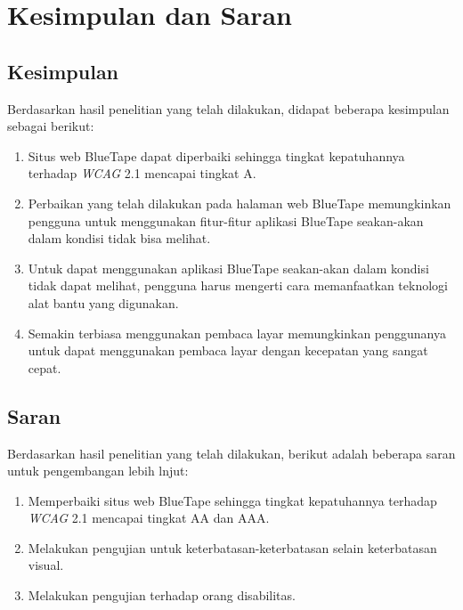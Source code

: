 \chapter{Kesimpulan dan Saran}
\label{chap:kesimpulan_dan_saran}

\section{Kesimpulan}
\label{sec:kesimpulan}
Berdasarkan hasil penelitian yang telah dilakukan, didapat beberapa kesimpulan sebagai berikut:

\begin{enumerate}
    \item Situs web BlueTape dapat diperbaiki sehingga tingkat kepatuhannya terhadap \textit{WCAG} 2.1 mencapai tingkat A.
    \item Perbaikan yang telah dilakukan pada halaman web BlueTape memungkinkan pengguna untuk menggunakan fitur-fitur aplikasi BlueTape seakan-akan dalam kondisi tidak bisa melihat.
    \item Untuk dapat menggunakan aplikasi BlueTape seakan-akan dalam kondisi tidak dapat melihat, pengguna harus mengerti cara memanfaatkan teknologi alat bantu yang digunakan.
    \item Semakin terbiasa menggunakan pembaca layar memungkinkan penggunanya untuk dapat menggunakan pembaca layar dengan kecepatan yang sangat cepat.
\end{enumerate}

\section{Saran}
\label{sec:saran}
Berdasarkan hasil penelitian yang telah dilakukan, berikut adalah beberapa saran untuk pengembangan lebih lnjut:
\begin{enumerate}
    \item Memperbaiki situs web BlueTape sehingga tingkat kepatuhannya terhadap \textit{WCAG} 2.1 mencapai tingkat AA dan AAA.
    \item Melakukan pengujian untuk keterbatasan-keterbatasan selain keterbatasan visual.
    \item Melakukan pengujian terhadap orang disabilitas.
\end{enumerate}
